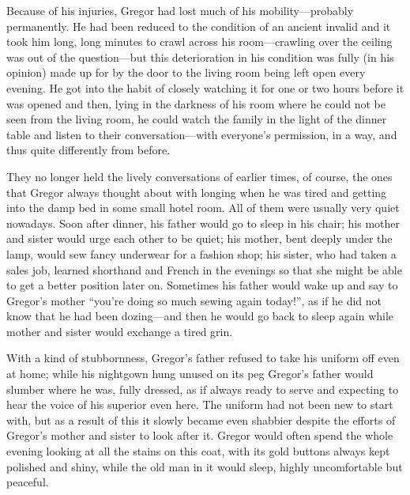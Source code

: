 Because of his injuries, Gregor had lost much of his mobility—probably
permanently. He had been reduced to the condition of an ancient invalid
and it took him long, long minutes to crawl across his room—crawling
over the ceiling was out of the question—but this deterioration in his
condition was fully (in his opinion) made up for by the door to the
living room being left open every evening. He got into the habit of
closely watching it for one or two hours before it was opened and then,
lying in the darkness of his room where he could not be seen from the
living room, he could watch the family in the light of the dinner table
and listen to their conversation—with everyone’s permission, in a way,
and thus quite differently from before.

They no longer held the lively conversations of earlier times, of
course, the ones that Gregor always thought about with longing when he
was tired and getting into the damp bed in some small hotel room. All
of them were usually very quiet nowadays. Soon after dinner, his father
would go to sleep in his chair; his mother and sister would urge each
other to be quiet; his mother, bent deeply under the lamp, would sew
fancy underwear for a fashion shop; his sister, who had taken a sales
job, learned shorthand and French in the evenings so that she might be
able to get a better position later on. Sometimes his father would wake
up and say to Gregor’s mother “you’re doing so much sewing again
today!”, as if he did not know that he had been dozing—and then he
would go back to sleep again while mother and sister would exchange a
tired grin.

With a kind of stubbornness, Gregor’s father refused to take his
uniform off even at home; while his nightgown hung unused on its peg
Gregor’s father would slumber where he was, fully dressed, as if always
ready to serve and expecting to hear the voice of his superior even
here. The uniform had not been new to start with, but as a result of
this it slowly became even shabbier despite the efforts of Gregor’s
mother and sister to look after it. Gregor would often spend the whole
evening looking at all the stains on this coat, with its gold buttons
always kept polished and shiny, while the old man in it would sleep,
highly uncomfortable but peaceful.

